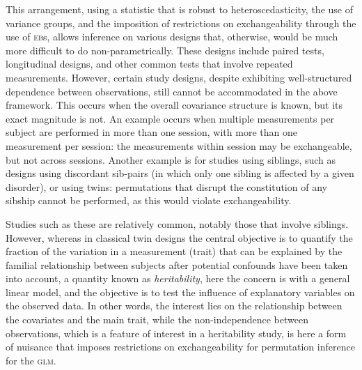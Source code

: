 This arrangement, using a statistic that is robust to heteroscedasticity, the use of variance groups, and the imposition of restrictions on exchangeability through the use of \textsc{eb}s, allows inference on various designs that, otherwise, would be much more difficult to do non-parametrically. These designs include paired tests, longitudinal designs, and other common tests that involve repeated measurements. However, certain study designs, despite exhibiting well-structured dependence between observations, still cannot be accommodated in the above framework. This occurs when the overall covariance structure is known, but its exact magnitude is not. An example occurs when multiple measurements per subject are performed in more than one session, with more than one measurement per session: the measurements within session may be exchangeable, but not across sessions. Another example is for studies using siblings, such as designs using discordant sib-pairs (in which only one sibling is affected by a given disorder), or using twins: permutations that disrupt the constitution of any sibship cannot be performed, as this would violate exchangeability.

Studies such as these are relatively common, notably those that involve siblings. However, whereas in classical twin designs the central objective is to quantify the fraction of the variation in a measurement (trait) that can be explained by the familial relationship between subjects after potential confounds have been taken into account, a quantity known as \emph{heritability}, here the concern is with a general linear model, and the objective is to test the influence of explanatory variables on the observed data. In other words, the interest lies on the relationship between the covariates and the main trait, while the non-independence between observations, which is a feature of interest in a heritability study, is here a form of nuisance that imposes restrictions on exchangeability for permutation inference for the \textsc{glm}.

